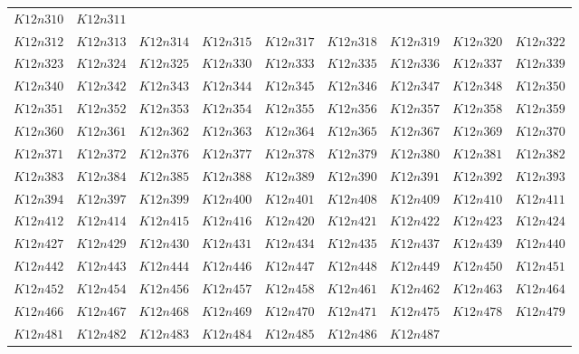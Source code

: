 \documentclass{amsart} %
\theoremstyle{thm}
\theoremstyle{definition}
\numberwithin{equation}{section}
\begin{document}
{\begin{longtable}{@{}lllllllll@{}}
  $K12n310$ &  
  $K12n311$ \\   
  $K12n312$ &  
  $K12n313$ &  
  $K12n314$ &  
  $K12n315$ &  
  $K12n317$ &  
  $K12n318$ &  
  $K12n319$ &  
  $K12n320$ &  
  $K12n322$ \\   
  $K12n323$ &  
  $K12n324$ &  
  $K12n325$ &  
  $K12n330$ &  
  $K12n333$ &  
  $K12n335$ &  
  $K12n336$ &  
  $K12n337$ &  
  $K12n339$ \\   
  $K12n340$ &  
  $K12n342$ &  
  $K12n343$ &  
  $K12n344$ &  
  $K12n345$ &  
  $K12n346$ &  
  $K12n347$ &  
  $K12n348$ &  
  $K12n350$ \\   
  $K12n351$ &  
  $K12n352$ &  
  $K12n353$ &  
  $K12n354$ &  
  $K12n355$ &  
  $K12n356$ &  
  $K12n357$ &  
  $K12n358$ &  
  $K12n359$ \\   
  $K12n360$ &  
  $K12n361$ &  
  $K12n362$ &  
  $K12n363$ &  
  $K12n364$ &  
  $K12n365$ &  
  $K12n367$ &  
  $K12n369$ &  
  $K12n370$ \\   
  $K12n371$ &  
  $K12n372$ &  
  $K12n376$ &  
  $K12n377$ &  
  $K12n378$ &  
  $K12n379$ &  
  $K12n380$ &  
  $K12n381$ &  
  $K12n382$ \\   
  $K12n383$ &  
  $K12n384$ &  
  $K12n385$ &  
  $K12n388$ &  
  $K12n389$ &  
  $K12n390$ &  
  $K12n391$ &  
  $K12n392$ &  
  $K12n393$ \\   
  $K12n394$ &  
  $K12n397$ &  
  $K12n399$ &  
  $K12n400$ &  
  $K12n401$ &  
  $K12n408$ &  
  $K12n409$ &  
  $K12n410$ &  
  $K12n411$ \\   
  $K12n412$ &  
  $K12n414$ &  
  $K12n415$ &  
  $K12n416$ &  
  $K12n420$ &  
  $K12n421$ &  
  $K12n422$ &  
  $K12n423$ &  
  $K12n424$ \\   
  $K12n427$ &  
  $K12n429$ &  
  $K12n430$ &  
  $K12n431$ &  
  $K12n434$ &  
  $K12n435$ &  
  $K12n437$ &  
  $K12n439$ &  
  $K12n440$ \\   
  $K12n442$ &  
  $K12n443$ &  
  $K12n444$ &  
  $K12n446$ &  
  $K12n447$ &  
  $K12n448$ &  
  $K12n449$ &  
  $K12n450$ &  
  $K12n451$ \\   
  $K12n452$ &  
  $K12n454$ &  
  $K12n456$ &  
  $K12n457$ &  
  $K12n458$ &  
  $K12n461$ &  
  $K12n462$ &  
  $K12n463$ &  
  $K12n464$ \\   
  $K12n466$ &  
  $K12n467$ &  
  $K12n468$ &  
  $K12n469$ &  
  $K12n470$ &  
  $K12n471$ &  
  $K12n475$ &  
  $K12n478$ &  
  $K12n479$ \\   
  $K12n481$ &  
  $K12n482$ &  
  $K12n483$ &  
  $K12n484$ &  
  $K12n485$ &  
  $K12n486$ &  
  $K12n487$ &  

\end{longtable}}
\end{document}

